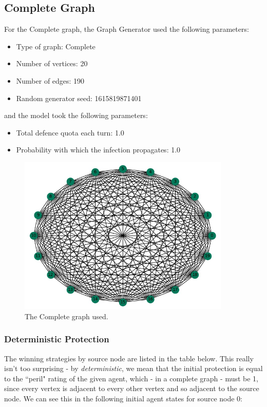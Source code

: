 \documentclass[results.tex]{subfiles}
\begin{document}
\subsection{Complete Graph}

For the Complete graph, the Graph Generator used the following parameters:

\begin{itemize}
\item Type of graph: Complete
\item Number of vertices: 20
\item Number of edges: 190
\item Random generator seed: 1615819871401
\end{itemize}
and the model took the following parameters:
\begin{itemize}
\item Total defence quota each turn: 1.0
\item Probability with which the infection propagates: 1.0
\end{itemize}

\begin{figure}[!ht]
	\centering
	\includegraphics[width=0.9\textwidth]{complete.jpg}
	\caption{The Complete graph used.}
	\label{fig:complete}
\end{figure}

\subsubsection{Deterministic Protection}

The winning strategies by source node are listed in the table below. This really isn't too surprising - by {\it deterministic}, we mean that the initial protection is equal to the ``peril" rating of the given agent, which - in a complete graph - must be 1, since every vertex is adjacent to every other vertex and so adjacent to the source node. We can see this in the following initial agent states for source node 0:
\end{document}
